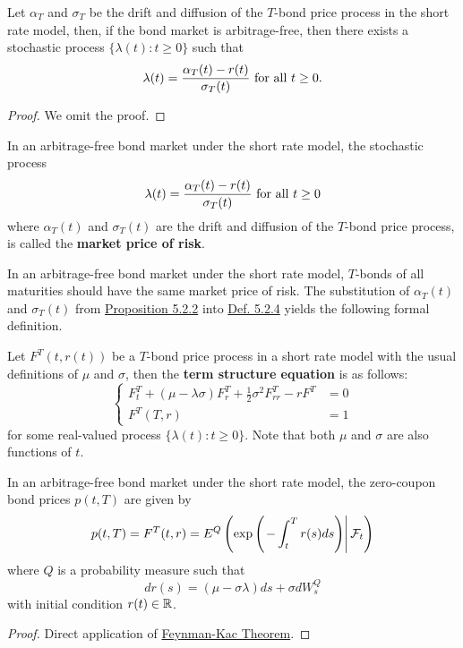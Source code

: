 \documentclass[11pt,fleqn]{book} %
\begin{document}
\begin{proposition} \label{prop:523}
Let \(\alpha_T\) and \(\sigma_T\) be the drift and diffusion of the \(T\)-bond price process in the short rate model, then, if the bond market is arbitrage-free, then there exists a stochastic process \(\{\lambda(t): t \geq 0\}\) such that
\[
\lambda(t) = \frac{\alpha_T(t) - r(t)}{\sigma_T(t)} \text{ for all } t \geq 0.
\]
\end{proposition}
\begin{proof}
We omit the proof.
\end{proof}

\begin{definition} \label{def:524}
In an arbitrage-free bond market under the short rate model, the stochastic process
\[
\lambda(t) = \frac{\alpha_T(t) - r(t)}{\sigma_T(t)} \text{ for all } t \geq 0
\]
where \(\alpha_T(t)\) and \(\sigma_T(t)\) are the drift and diffusion of the \(T\)-bond price process, is called the \textbf{market price of risk}.
\end{definition}

\begin{remark} \label{rmk:525}
In an arbitrage-free bond market under the short rate model, \(T\)-bonds of all maturities should have the same market price of risk. The substitution of \(\alpha_T(t)\) and \(\sigma_T(t)\) from \hyperref[prop:522]{Proposition 5.2.2} into \hyperref[def:524]{Def. 5.2.4} yields the following formal definition.
\end{remark}

\begin{definition} \label{def:526}
Let \(F^T(t, r(t))\) be a \(T\)-bond price process in a short rate model with the usual definitions of \(\mu\) and \(\sigma\), then the \textbf{term structure equation} is as follows:
\[
\left\{
\begin{array}{rl}
F_t^T + (\mu - \lambda\sigma)F_r^T + \frac12\sigma^2F_{rr}^T - rF^T &= 0 \\
F^T(T, r) &= 1
\end{array}
\right.
\]
for some real-valued process \(\{\lambda(t): t \geq 0\}\). Note that both \(\mu\) and \(\sigma\) are also functions of \(t\).
\end{definition}

\begin{theorem} \label{thm:527}
In an arbitrage-free bond market under the short rate model, the zero-coupon bond prices \(p(t, T)\) are given by
\[
p(t, T) = F^T(t, r) = E^Q\left(\exp\left(\left.-\int_t^T r(s)ds\right)\right|\mathcal{F}_t\right)
\]
where \(Q\) is a probability measure such that
\[
dr(s) = (\mu - \sigma\lambda)ds + \sigma dW_s^Q
\]
with initial condition \(r(t) \in \mathbb{R}\).
\end{theorem}
\begin{proof}
Direct application of \hyperref[thm:416]{Feynman-Kac Theorem}.
\end{proof}
\end{document}
